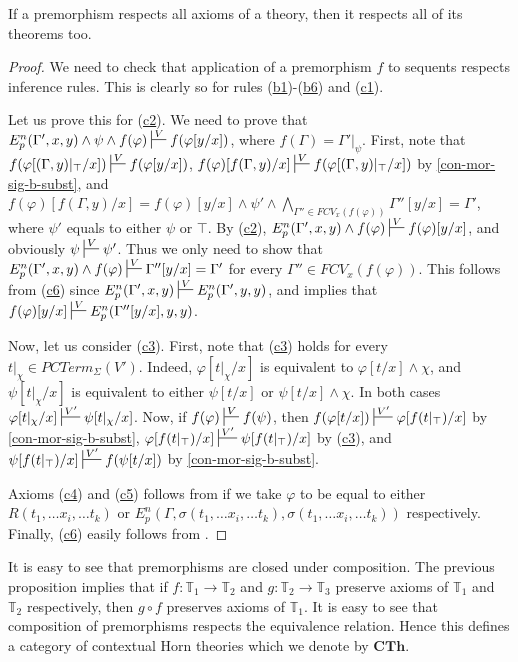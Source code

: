 \documentclass[reqno]{amsart}
\newcommand{\axref}[1]{(\hyperref[ax:#1]{#1})}
\theoremstyle{definition}
\theoremstyle{remark}
\newcommand{\cat}[1]{\mathbf{#1}}
\newcommand{\CTh}{\cat{CTh}}
\numberwithin{figure}{section}
\begin{document}
\begin{prop}
If a premorphism respects all axioms of a theory, then it respects all of its theorems too.
\end{prop}
\begin{proof}
We need to check that application of a premorphism $f$ to sequents respects inference rules.
This is clearly so for rules \axref{b1}-\axref{b6} and \axref{c1}.

Let us prove this for \axref{c2}.
We need to prove that $E^n_p(\Gamma',x,y) \land \psi \land f(\varphi) \sststile{}{V} f(\varphi[y/x])$, where $f(\Gamma) = \Gamma'|_\psi$.
First, note that $f(\varphi[(\Gamma,y)|_\top/x]) \sststile{}{V} f(\varphi[y/x])$, $f(\varphi)[f(\Gamma,y)/x] \sststile{}{V} f(\varphi[(\Gamma,y)|_\top/x])$ by \eqref{con-mor-sig-b-subst},
    and $f(\varphi)[f(\Gamma,y)/x] = f(\varphi)[y/x] \land \psi' \land \bigwedge\limits_{\Gamma'' \in FCV_x(f(\varphi))} \Gamma''[y/x] = \Gamma'$,
    where $\psi'$ equals to either $\psi$ or $\top$.
By \axref{c2}, $E^n_p(\Gamma',x,y) \land f(\varphi) \sststile{}{V} f(\varphi)[y/x]$, and obviously $\psi \sststile{}{V} \psi'$.
Thus we only need to show that $E^n_p(\Gamma',x,y) \land f(\varphi) \sststile{}{V} \Gamma''[y/x] = \Gamma'$ for every $\Gamma'' \in FCV_x(f(\varphi))$.
This follows from \axref{c6} since $E^n_p(\Gamma',x,y) \sststile{}{V} E^n_p(\Gamma',y,y)$, and  implies that $f(\varphi)[y/x] \sststile{}{V} E^n_p(\Gamma''[y/x],y,y)$.

Now, let us consider \axref{c3}.
First, note that \axref{c3} holds for every $t|_\chi \in PCTerm_\Sigma(V')$.
Indeed, $\varphi[t|_\chi/x]$ is equivalent to $\varphi[t/x] \land \chi$, and $\psi[t|_\chi/x]$ is equivalent to either $\psi[t/x]$ or $\psi[t/x] \land \chi$.
In both cases $\varphi[t|_\chi/x] \sststile{}{V'} \psi[t|_\chi/x]$.
Now, if $f(\varphi) \sststile{}{V} f(\psi)$, then $f(\varphi[t/x]) \sststile{}{V'} \varphi[f(t|_\top)/x]$ by \eqref{con-mor-sig-b-subst},
    $\varphi[f(t|_\top)/x] \sststile{}{V'} \psi[f(t|_\top)/x]$ by \axref{c3}, and $\psi[f(t|_\top)/x] \sststile{}{V'} f(\psi[t/x])$ by \eqref{con-mor-sig-b-subst}.

Axioms \axref{c4} and \axref{c5} follows from  if we take $\varphi$ to be equal to either $R(t_1, \ldots x_i, \ldots t_k)$
    or $E^n_p(\Gamma, \sigma(t_1, \ldots x_i, \ldots t_k), \sigma(t_1, \ldots x_i, \ldots t_k))$ respectively.
Finally, \axref{c6} easily follows from .
\end{proof}

It is easy to see that premorphisms are closed under composition.
The previous proposition implies that if $f : \mathbb{T}_1 \to \mathbb{T}_2$ and $g : \mathbb{T}_2 \to \mathbb{T}_3$ preserve axioms of $\mathbb{T}_1$ and $\mathbb{T}_2$ respectively,
then $g \circ f$ preserves axioms of $\mathbb{T}_1$.
It is easy to see that composition of premorphisms respects the equivalence relation.
Hence this defines a category of contextual Horn theories which we denote by $\CTh$.
\end{document}
